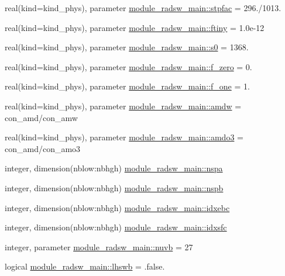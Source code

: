 \begin{DoxyCompactItemize}
\item 
real(kind=kind\+\_\+phys), parameter \hyperlink{group__module__radsw__main_ga4d32ea8f0f1bca37e3351a5ae5077f77}{module\+\_\+radsw\+\_\+main\+::stpfac} = 296./1013.
\item 
real(kind=kind\+\_\+phys), parameter \hyperlink{group__module__radsw__main_gabe91ed52b6016e99a2d0c874524fb27f}{module\+\_\+radsw\+\_\+main\+::ftiny} = 1.\+0e-\/12
\item 
real(kind=kind\+\_\+phys), parameter \hyperlink{group__module__radsw__main_ga244c149eb05c0675a7e040dbf7e2bc4b}{module\+\_\+radsw\+\_\+main\+::s0} = 1368.
\item 
real(kind=kind\+\_\+phys), parameter \hyperlink{group__module__radsw__main_gad54ac2d2bd5c4b3bd692c76d2a0bcc5d}{module\+\_\+radsw\+\_\+main\+::f\+\_\+zero} = 0.
\item 
real(kind=kind\+\_\+phys), parameter \hyperlink{group__module__radsw__main_gad256aaca9c9d6b5d161ae21f68989db6}{module\+\_\+radsw\+\_\+main\+::f\+\_\+one} = 1.
\item 
real(kind=kind\+\_\+phys), parameter \hyperlink{group__module__radsw__main_ga1445a63250d89083447371120c484618}{module\+\_\+radsw\+\_\+main\+::amdw} = con\+\_\+amd/con\+\_\+amw
\item 
real(kind=kind\+\_\+phys), parameter \hyperlink{group__module__radsw__main_ga527e5e1cec6ad0800f69a606fde77369}{module\+\_\+radsw\+\_\+main\+::amdo3} = con\+\_\+amd/con\+\_\+amo3
\item 
integer, dimension(nblow\+:nbhgh) \hyperlink{group__module__radsw__main_ga4c0fc140a51c619089128f52e4bb878c}{module\+\_\+radsw\+\_\+main\+::nspa}
\item 
integer, dimension(nblow\+:nbhgh) \hyperlink{group__module__radsw__main_ga6be022a4a1ae32248d9721a9fff93db6}{module\+\_\+radsw\+\_\+main\+::nspb}
\item 
integer, dimension(nblow\+:nbhgh) \hyperlink{group__module__radsw__main_gaa20102786f7e7f8c71fb2783082eac1b}{module\+\_\+radsw\+\_\+main\+::idxebc}
\item 
integer, dimension(nblow\+:nbhgh) \hyperlink{group__module__radsw__main_gad295d723dd7d269cb51c73923a4cbb94}{module\+\_\+radsw\+\_\+main\+::idxsfc}
\item 
integer, parameter \hyperlink{group__module__radsw__main_ga177282b3087dce2f54f1233ee8631231}{module\+\_\+radsw\+\_\+main\+::nuvb} = 27
\item 
logical \hyperlink{group__module__radsw__main_ga08bfecbd5edb2ad3ba0ae836cfe18d05}{module\+\_\+radsw\+\_\+main\+::lhswb} = .false.

\end{DoxyCompactItemize}
